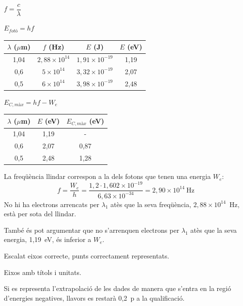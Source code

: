 \begin{solapartat}
 $f = \dfrac{c}{\lambda}$

 $E_{\textit{fotó}} = hf$


\begin{center}
\begin{tabular}{cccc}
\toprule
$\lambda$ ($\mu$m) & $f$ (Hz) & $E$ (J) & $E$ (eV)\\
\midrule
1,04 & $2,88\times 10^{14}$ & $1,91\times 10^{-19}$ & 1,19\\
0,6 & $5\times 10^{14}$ & $3,32\times 10^{-19}$ & 2,07\\
0,5 & $6\times 10^{14}$ & $3,98\times 10^{-19}$ & 2,48\\
\bottomrule
\end{tabular}
\end{center}
\end{solapartat}

\begin{solapartat}
 $E_{C,\textit{màx}} = hf - W_e$

\begin{center}
\begin{tabular}{ccc}
\toprule
$\lambda$ ($\mu$m) & $E$ (eV) & $E_{C,\textit{màx}}$ (eV)\\
\midrule
1,04 & 1,19 & -\\
0,6 & 2,07 & 0,87\\
0,5 & 2,48 & 1,28\\
\bottomrule
\end{tabular}
\end{center}

 La freqüència llindar correspon a la dels fotons que tenen una energia $W_e$:
\[ f = \frac{W_e}{h} = \frac{1,2\cdot 1,602\times 10^{-19}}{6,63\times 10^{-34}} = 2,90\times 10^{14}\ \mathrm{Hz} \]
No hi ha electrons arrencats per $\lambda_1$ atès que la seva freqüència, $2,88\times 10^{14}$~Hz, està per sota del llindar.

També és pot argumentar que no s'arrenquen electrons per $\lambda_1$ atès que la seva energia, 1,19~eV, és inferior a $W_e$.


 Escalat eixos correcte, punts correctament representats.

 Eixos amb títols i unitats.

Si es representa l'extrapolació de les dades de manera que s'entra en la regió d'energies negatives, llavors es restarà 0,2~p a la qualificació.
\end{solapartat}
